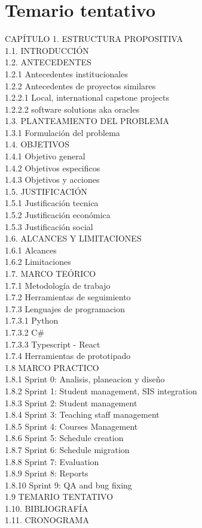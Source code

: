 \section{Temario tentativo}

CAPÍTULO 1. ESTRUCTURA PROPOSITIVA \\
1.1. INTRODUCCIÓN \\
1.2. ANTECEDENTES \\
1.2.1 Antecedentes institucionales \\
1.2.2 Antecedentes de proyectos similares \\
1.2.2.1 Local, international capstone projects \\
1.2.2.2 software solutions aka oracles \\
1.3. PLANTEAMIENTO DEL PROBLEMA \\
1.3.1 Formulación del problema \\
1.4. OBJETIVOS \\
1.4.1 Objetivo general\\
1.4.2 Objetivos especificos \\
1.4.3 Objetivos y acciones \\
1.5. JUSTIFICACIÓN \\
1.5.1 Justificación tecnica \\
1.5.2 Justificación económica \\
1.5.3 Justificación social \\
1.6. ALCANCES Y LIMITACIONES \\
1.6.1 Alcances \\
1.6.2 Limitaciones  \\
1.7. MARCO TEÓRICO \\
1.7.1 Metodología de trabajo \\
1.7.2 Herramientas de seguimiento \\
1.7.3 Lenguajes de programacion \\
1.7.3.1 Python  \\
1.7.3.2 C# \\
1.7.3.3 Typescript - React \\
1.7.4 Herramientas de prototipado  \\
1.8 MARCO PRACTICO \\
1.8.1 Sprint 0: Analisis, planeacion y diseño \\
1.8.2 Sprint 1: Student management, SIS integration \\
1.8.3 Sprint 2: Student management \\
1.8.4 Sprint 3: Teaching staff management \\
1.8.5 Sprint 4: Courses Management \\
1.8.6 Sprint 5: Schedule creation \\
1.8.7 Sprint 6: Schedule migration \\
1.8.8 Sprint 7: Evaluation \\
1.8.9 Sprint 8: Reports \\
1.8.10 Sprint 9: QA and bug fixing \\
1.9 TEMARIO TENTATIVO \\
1.10. BIBLIOGRAFÍA \\
1.11. CRONOGRAMA \\

